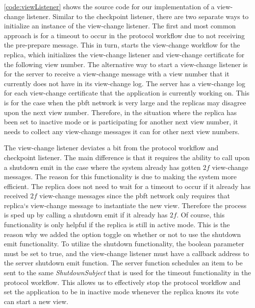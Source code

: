 \iffalse
\autoref{code:viewListener} shows the source code for our implementation of a view-change listener. Similar to the checkpoint listener, there are two separate ways to initialize an instance of the view-change listener. The first and most common approach is for a timeout to occur in the protocol workflow due to not receiving the pre-prepare message. This in turn, starts the view-change workflow for the replica, which initializes the view-change listener and view-change certificate for the following view number. The alternative way to start a view-change listener is for the server to receive a view-change message with a view number that it currently does not have in its view-change log. The server has a view-change log for each view-change certificate that the application is currently working on. This is for the case when the \ac{pbft} network is very large and the replicas may disagree upon the next view number. Therefore, in the situation where the replica has been set to inactive mode or is participating for another next view number, it needs to collect any view-change messages it can for other next view numbers.

The view-change listener deviates a bit from the protocol workflow and checkpoint listener. The main difference is that it requires the ability to call upon a shutdown emit in the case where the system already has gotten $2f$ view-change messages. The reason for this functionality is due to making the system more efficient. The replica does not need to wait for a timeout to occur if it already has received $2f$ view-change messages since the \ac{pbft} network only requires that replica`s view-change message to instantiate the new view. Therefore the process is sped up by calling a shutdown emit if it already has $2f$. Of course, this functionality is only helpful if the replica is still in active mode. This is the reason why we added the option toggle on whether or not to use the shutdown emit functionality. To utilize the shutdown functionality, the boolean parameter  must be set to true, and the view-change listener must have a callback address to the server shutdown emit function. The server function schedules an item to be sent to the same  \emph{ShutdownSubject} that is used for the timeout functionality in the protocol workflow. This allows us to effectively stop the protocol workflow and set the application to be in inactive mode whenever the replica knows its vote can start a new view. 

